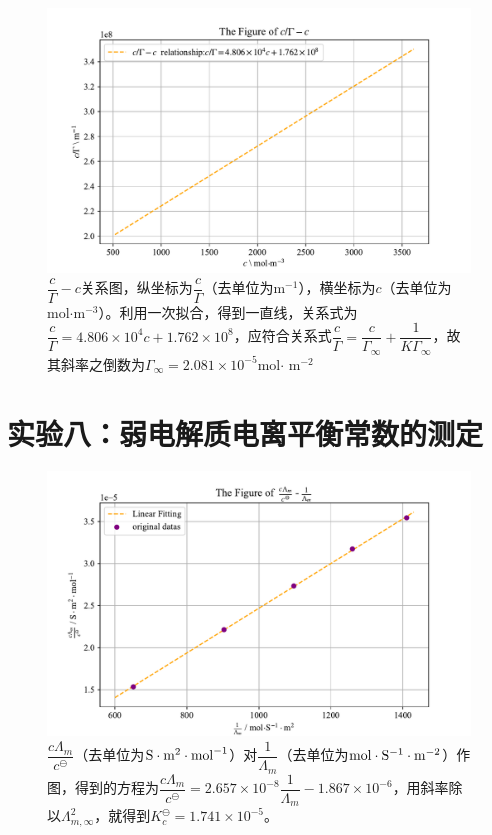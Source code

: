 \documentclass[UTF8,AutoFakeBold,a4paper]{article}
\begin{document}
\begin{figure}[h]
	\centering
	\includegraphics[scale=0.8]{Figure3}
	\caption{$\dfrac{c}{\varGamma}-c$关系图，纵坐标为$\dfrac{c}{\varGamma}$（去单位为m$^{-1}$），横坐标为$c$（去单位为 mol$\cdot $m$^{-3}$）。利用一次拟合，得到一直线，关系式为\textcolor[rgb]{0.54,0.13,0.33}{$\dfrac{c}{\varGamma} = 4.806 \times 10^{4}c + 1.762 \times 10^{8}$}，应符合关系式\textcolor[rgb]{0.07,0.36,0.57}{$\dfrac{c}{\varGamma} = \dfrac{c}{\varGamma_{\infty}}+\dfrac{1}{K\varGamma_{\infty}}$}，故其斜率之倒数为$\varGamma_{\infty} = 2.081 \times10^{-5}$mol$\cdot$ m$^{-2}$}
	\label{fi4}
\end{figure}
\newpage
\section{实验八：弱电解质电离平衡常数的测定}
\begin{figure}[h]
	\centering
	\includegraphics[scale=0.8]{Map}
	\caption{$\dfrac{c\varLambda_{m}}{c^{\ominus}} $（去单位为$\rm{S}\cdot\rm{m}^{2}\cdot\rm{mol}^{-1}$）对$ \dfrac{1}{\varLambda_{m}}$（去单位为$\rm{mol}\cdot\rm{S}^{-1}\cdot\rm{m}^{-2}$）作图，得到的方程为\textcolor[rgb]{0.54,0.13,0.33}{$\dfrac{c\varLambda_{m}}{c^{\ominus}} =2.657\times 10^{-8} \dfrac{1}{\varLambda_{m}}- 1.867\times 10^{-6}$}，用斜率除以$\varLambda_{m,\infty}^{2}$，就得到\textcolor[rgb]{0.54,0.13,0.33}{$K_{c}^{\ominus} = 1.741\times 10^{-5}$}。}
	\label{fi5}
\end{figure}
\end{document}
